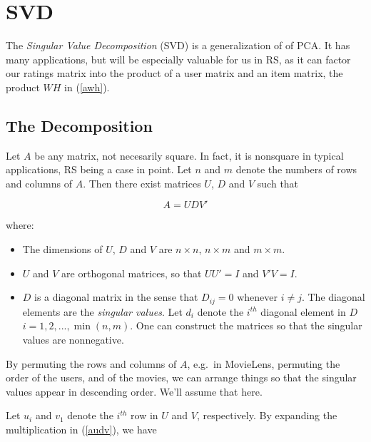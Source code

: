 \section{SVD}

The \textit{Singular Value Decomposition} (SVD) is a generalization of
of PCA.  It has many applications, but will be especially valuable for
us in RS, as it can factor our ratings matrix into the product of a user
matrix and an item matrix, the product $WH$ in (\ref{awh}).  

\subsection{The Decomposition}

Let $A$ be any matrix, not necesarily square.  In fact, it is nonsquare
in typical applications, RS being a case in point.  Let $n$ and $m$
denote the numbers of rows and columns of $A$.
Then there exist matrices $U$, $D$ and $V$ such that

\begin{equation}
\label{audv}
A = U D V'
\end{equation}

where:

\begin{itemize}

\item The dimensions of $U$, $D$ and $V$ are $n \times n$, $n \times m$
and $m \times m$.

\item $U$ and $V$ are orthogonal matrices, so that $U U' = I$ and $V'V =
I$.

\item $D$ is a diagonal matrix in the sense that $D_{ij} = 0$ whenever
$i \neq j$.  The diagonal elements are the \textit{singular values}.
Let $d_{i}$ denote the $i^{th}$ diagonal element in $D$
$i = 1,2,...,\min(n,m)$.  One can construct the matrices so that the
singular values are nonnegative.

\end{itemize} 

By permuting the rows and columns of $A$, e.g.\ in MovieLens, permuting
the order of the users, and of the movies, we can arrange things so that
the singular values appear in descending order.  We'll assume that
here.

Let $u_i$ and $v_1$ denote the $i^{th}$ row in $U$ and $V$, 
respectively.  By expanding the multiplication in (\ref{audv}), we have

